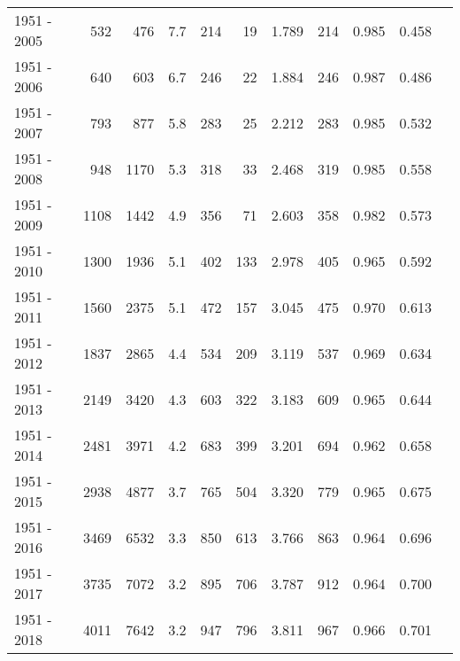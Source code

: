 \begin{tabular}{lrrrrrrrrrr}
1951 - 2005 &      532 &      476 &    7.7 &                     214 &                         19 &       1.789 &            214 &       0.985 &             0.458 \\
1951 - 2006 &      640 &      603 &    6.7 &                     246 &                         22 &       1.884 &            246 &       0.987 &             0.486 \\
1951 - 2007 &      793 &      877 &    5.8 &                     283 &                         25 &       2.212 &            283 &       0.985 &             0.532 \\
1951 - 2008 &      948 &     1170 &    5.3 &                     318 &                         33 &       2.468 &            319 &       0.985 &             0.558 \\
1951 - 2009 &     1108 &     1442 &    4.9 &                     356 &                         71 &       2.603 &            358 &       0.982 &             0.573 \\
1951 - 2010 &     1300 &     1936 &    5.1 &                     402 &                        133 &       2.978 &            405 &       0.965 &             0.592 \\
1951 - 2011 &     1560 &     2375 &    5.1 &                     472 &                        157 &       3.045 &            475 &       0.970 &             0.613 \\
1951 - 2012 &     1837 &     2865 &    4.4 &                     534 &                        209 &       3.119 &            537 &       0.969 &             0.634 \\
1951 - 2013 &     2149 &     3420 &    4.3 &                     603 &                        322 &       3.183 &            609 &       0.965 &             0.644 \\
1951 - 2014 &     2481 &     3971 &    4.2 &                     683 &                        399 &       3.201 &            694 &       0.962 &             0.658 \\
1951 - 2015 &     2938 &     4877 &    3.7 &                     765 &                        504 &       3.320 &            779 &       0.965 &             0.675 \\
1951 - 2016 &     3469 &     6532 &    3.3 &                     850 &                        613 &       3.766 &            863 &       0.964 &             0.696 \\
1951 - 2017 &     3735 &     7072 &    3.2 &                     895 &                        706 &       3.787 &            912 &       0.964 &             0.700 \\
1951 - 2018 &     4011 &     7642 &    3.2 &                     947 &                        796 &       3.811 &            967 &       0.966 &             0.701 \\
\bottomrule
\end{tabular}
